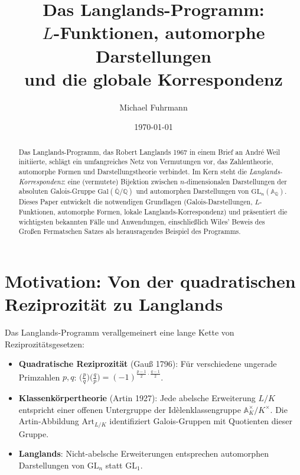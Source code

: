\documentclass[12pt,a4paper]{amsart}
\theoremstyle{definition}
\newcommand{\Q}{\mathbb{Q}}
\newcommand{\GL}{\mathrm{GL}}
\newcommand{\GQ}{\mathrm{Gal}(\bar{\Q}/\Q)}
\newcommand{\Art}{\mathrm{Art}}
\begin{document}

\title{Das Langlands-Programm:\\
       $L$-Funktionen, automorphe Darstellungen\\
       und die globale Korrespondenz}

\author{Michael Fuhrmann}
\address{Specialist Mathematics Project, Build 120}
\date{\today}

\begin{abstract}
Das Langlands-Programm, das Robert Langlands 1967 in einem Brief an André Weil
initiierte, schlägt ein umfangreiches Netz von Vermutungen vor, das Zahlentheorie,
automorphe Formen und Darstellungstheorie verbindet.  Im Kern steht die
\emph{Langlands-Korrespondenz}: eine (vermutete) Bijektion zwischen
$n$-dimensionalen Darstellungen der absoluten Galois-Gruppe $\GQ$ und
automorphen Darstellungen von $\GL_n(\mathbb{A}_\Q)$.  Dieses Paper entwickelt
die notwendigen Grundlagen (Galois-Darstellungen, $L$-Funktionen, automorphe
Formen, lokale Langlands-Korrespondenz) und präsentiert die wichtigsten bekannten
Fälle und Anwendungen, einschließlich Wiles' Beweis des Großen Fermatschen Satzes
als herausragendes Beispiel des Programms.
\end{abstract}

\maketitle
\tableofcontents

\section{Motivation: Von der quadratischen Reziprozität zu Langlands}

Das Langlands-Programm verallgemeinert eine lange Kette von Reziprozitätsgesetzen:

\begin{itemize}
  \item \textbf{Quadratische Reziprozität} (Gauß 1796): Für verschiedene ungerade Primzahlen $p, q$:
    $\bigl(\frac{p}{q}\bigr)\bigl(\frac{q}{p}\bigr) = (-1)^{\frac{p-1}{2}\cdot\frac{q-1}{2}}$.
  \item \textbf{Klassenkörpertheorie} (Artin 1927): Jede abelsche Erweiterung $L/K$
    entspricht einer offenen Untergruppe der Idèlenklassengruppe $\mathbb{A}_K^\times/K^\times$.
    Die Artin-Abbildung $\Art_{L/K}$ identifiziert Galois-Gruppen mit Quotienten dieser Gruppe.
  \item \textbf{Langlands}: Nicht-abelsche Erweiterungen entsprechen automorphen
    Darstellungen von $\GL_n$ statt $\GL_1$.
\end{itemize}
\end{document}
